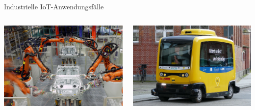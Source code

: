 \begin{frame}[allowframebreaks]{Industrielle IoT-Anwendungsfälle}
    \begin{columns}
        \begin{column}[b]{.45\textwidth}
            \begin{center}
                \includegraphics[width=\textwidth]{img/iiot-fertigung}
            \end{center}
        \end{column}
        \begin{column}[b]{.45\textwidth}
            \begin{center}
                \includegraphics[width=\textwidth]{img/iiot-autonomes-fahren}
            \end{center}
        \end{column}
    \end{columns}


\end{frame}
